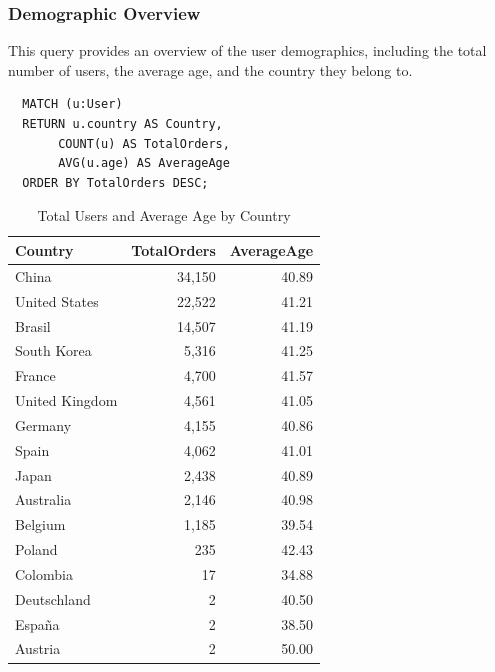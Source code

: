 \documentclass[a4paper,12pt]{article}
\begin{document}
\subsubsection{Demographic Overview}
This query provides an overview of the user demographics, including the total number of users, the average age, and the country they belong to.
\begin{verbatim}
  MATCH (u:User)
  RETURN u.country AS Country, 
       COUNT(u) AS TotalOrders,
       AVG(u.age) AS AverageAge
  ORDER BY TotalOrders DESC;
\end{verbatim}
\begin{table}[h!]
  \centering
  \caption{Total Users and Average Age by Country}
  \label{tab:Average_age}
  \begin{tabular}{l r r}
      \toprule
      \textbf{Country} & \textbf{TotalOrders} & \textbf{AverageAge} \\
      \midrule
      China           & 34,150  & 40.89 \\
      United States   & 22,522  & 41.21 \\
      Brasil          & 14,507  & 41.19 \\
      South Korea     & 5,316   & 41.25 \\
      France          & 4,700   & 41.57 \\
      United Kingdom  & 4,561   & 41.05 \\
      Germany         & 4,155   & 40.86 \\
      Spain           & 4,062   & 41.01 \\
      Japan           & 2,438   & 40.89 \\
      Australia       & 2,146   & 40.98 \\
      Belgium         & 1,185   & 39.54 \\
      Poland          & 235     & 42.43 \\
      Colombia        & 17      & 34.88 \\
      Deutschland     & 2       & 40.50 \\
      España          & 2       & 38.50 \\
      Austria         & 2       & 50.00 \\
      \bottomrule
  \end{tabular}
\end{table}
\end{document}
